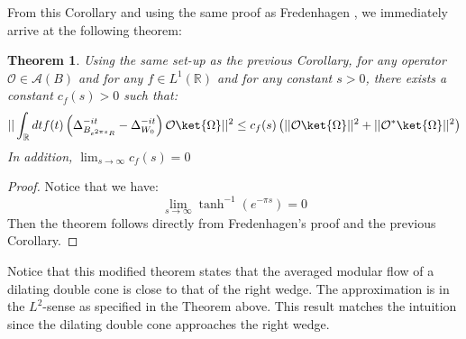 \documentclass[a4paper,11pt]{article}
\newtheorem{theorem}{Theorem}
\theoremstyle{definition}
\theoremstyle{remark}
\newcommand{\lb}{\left(}
\newcommand{\rb}{\right)}
\begin{document}
From this Corollary and using the same proof as Fredenhagen \cite{fredenhagen}, we immediately arrive at the following theorem:
\begin{theorem}\label{theorem:modifiedfredenhagen}
    Using the same set-up as the previous Corollary, for any operator $\mathcal{O}\in \mathcal{A}(B)$ and for any $f\in L^1(\mathbb{R})$ and for any constant $s > 0$, there exists a constant $c_f(s) > 0$ such that:
    \begin{equation}
        ||\int_\mathbb{R} dt f(t)\lb\Delta^{-it}_{B_{e^{2\pi s}R}} - \Delta^{-it}_{W_0}\rb\mathcal{O}\ket{\Omega}||^2 \leq c_f(s)\lb||\mathcal{O}\ket{\Omega}||^2 + ||\mathcal{O}^*\ket{\Omega}||^2\rb
    \end{equation}
    In addition, $\lim_{s\rightarrow \infty}c_f(s) = 0$
\end{theorem}
\begin{proof}
    Notice that we have:
    \begin{equation}
        \lim_{s\rightarrow\infty}\tanh^{-1}(e^{-\pi s}) = 0
    \end{equation}
    Then the theorem follows directly from Fredenhagen's proof and the previous Corollary.
\end{proof}
Notice that this modified theorem states that the averaged modular flow  of a dilating double cone is close to that of the right wedge. The approximation is in the $L^2$-sense as specified in the Theorem above. This result matches the intuition since the dilating double cone approaches the right wedge.
\end{document}
